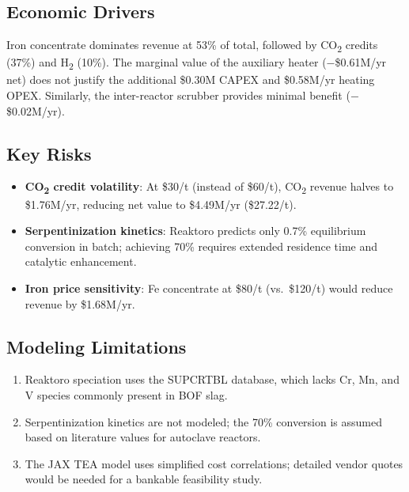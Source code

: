 \documentclass[11pt,a4paper]{article}
\begin{document}
\subsection{Economic Drivers}

Iron concentrate dominates revenue at 53\% of total, followed by
CO\textsubscript{2} credits (37\%) and H\textsubscript{2} (10\%).  The marginal
value of the auxiliary heater ($-$\$\num{0.61}M/yr net) does not justify the
additional \$\num{0.30}M CAPEX and \$\num{0.58}M/yr heating OPEX.  Similarly, the
inter-reactor scrubber provides minimal benefit ($-$\$\num{0.02}M/yr).

\subsection{Key Risks}

\begin{itemize}[nosep]
    \item \textbf{CO\textsubscript{2} credit volatility}: At \$30/t (instead of \$60/t),
          CO\textsubscript{2} revenue halves to \$\num{1.76}M/yr, reducing net value
          to \$\num{4.49}M/yr (\$\num{27.22}/t).
    \item \textbf{Serpentinization kinetics}: Reaktoro predicts only 0.7\% equilibrium
          conversion in batch; achieving 70\% requires extended residence time and
          catalytic enhancement.
    \item \textbf{Iron price sensitivity}: Fe concentrate at \$80/t (vs.\ \$120/t) would
          reduce revenue by \$\num{1.68}M/yr.
\end{itemize}

\subsection{Modeling Limitations}

\begin{enumerate}[nosep]
    \item Reaktoro speciation uses the SUPCRTBL database, which lacks Cr, Mn, and V
          species commonly present in BOF slag.
    \item Serpentinization kinetics are not modeled; the 70\% conversion is assumed
          based on literature values for autoclave reactors.
    \item The JAX TEA model uses simplified cost correlations; detailed vendor quotes
          would be needed for a bankable feasibility study.
\end{enumerate}
\end{document}
